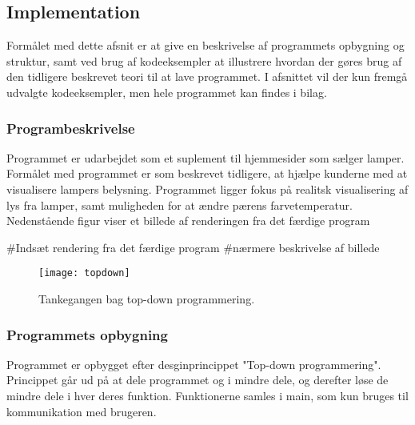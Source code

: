 \subsection{Implementation}

Formålet med dette afsnit er at give en beskrivelse af programmets opbygning og struktur, samt ved brug af kodeeksempler at illustrere hvordan der gøres brug af den tidligere beskrevet teori til at lave programmet. I afsnittet vil der kun fremgå udvalgte kodeeksempler, men hele programmet kan findes i bilag. 

\subsubsection{Programbeskrivelse}

Programmet er udarbejdet som et suplement til hjemmesider som sælger lamper. Formålet med programmet er som beskrevet tidligere, at hjælpe kunderne med at visualisere lampers belysning. Programmet ligger fokus på realitsk visualisering af lys fra lamper, samt muligheden for at ændre pærens farvetemperatur.
Nedenstående figur viser et billede af renderingen fra det færdige program

\#Indsæt rendering fra det færdige program
\#nærmere beskrivelse af billede
\begin{figure}[H]
    \centering
    \texttt{[image: topdown]}
    \caption{Tankegangen bag top-down programmering.}
    \label{fig:topdown}
\end{figure} 

\subsubsection{Programmets opbygning}

Programmet er opbygget efter desginprincippet "Top-down programmering". Princippet går ud på at dele programmet og i mindre dele, og derefter løse de mindre dele i hver deres funktion. Funktionerne samles i main, som kun bruges til kommunikation med brugeren. 

